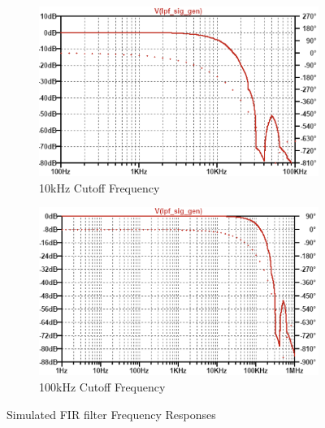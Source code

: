\begin{figure}[H]
    \centering
    \begin{subfigure}[b]{0.48\textwidth}
        \centering
        \includegraphics[width=\textwidth]{FIR_10k.png}
        \caption{10kHz Cutoff Frequency}
        \label{fig:fir_10k}
    \end{subfigure}\hfill
    \begin{subfigure}[b]{0.48\textwidth}
        \centering
        \includegraphics[width=\textwidth]{FIR_100k.png}
        \caption{100kHz Cutoff Frequency}
        \label{fig:fir_100k}
    \end{subfigure}
    \caption{Simulated FIR filter Frequency Responses}
    \label{fig:lt_aa_freq}
\end{figure}

